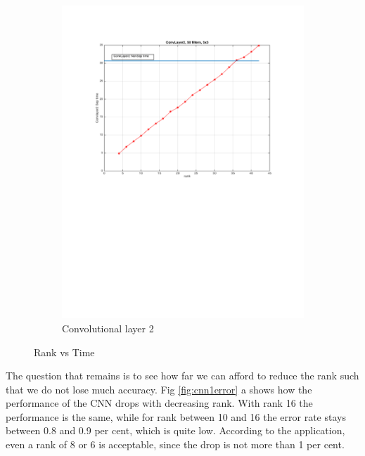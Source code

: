 \begin{figure}[h]
\begin{subfigure}[b]{0.40\textwidth}
    \includegraphics[width=\textwidth]{images/imagesCNN_page3.pdf}
    \caption{Convolutional layer 2}
  \end{subfigure}
  \caption{Rank vs Time}
  \label{fig:cnn1time}
\end{figure}

The question that remains is to see how far we can afford to reduce the rank such that we do not lose much accuracy. Fig \ref{fig:cnn1error} a shows how the performance of the CNN drops with decreasing rank. With rank 16 the performance is the same, while for rank between 10 and 16 the error rate stays between 0.8 and 0.9 per cent, which is quite low. According to the application, even a rank of 8 or 6 is acceptable, since the drop is not more than 1 per cent.

